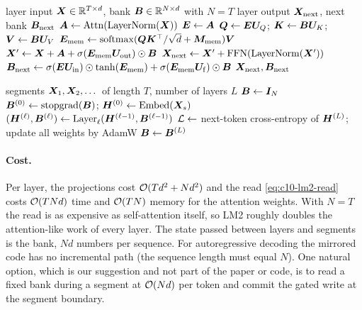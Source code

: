 \begin{algorithm}[t]
\caption{One LM2 decoder layer (parallel form, per-token gates)}\label{alg:c10-lm2-layer}
\begin{algorithmic}[1]
\Require layer input $\bm{X} \in \mathbb{R}^{T\times d}$, bank $\bm{B} \in \mathbb{R}^{N\times d}$ with $N = T$
\Ensure layer output $\bm{X}_{\mathrm{next}}$, next bank $\bm{B}_{\mathrm{next}}$
\State $\bm{A} \gets \mathrm{Attn}(\operatorname{LayerNorm}(\bm{X}))$ 
\State $\bm{E} \gets \bm{A}$ 
\State $\bm{Q} \gets \bm{E}\bm{U}_Q$;\; $\bm{K} \gets \bm{B}\bm{U}_K$;\; $\bm{V} \gets \bm{B}\bm{U}_V$
\State $\bm{E}_{\mathrm{mem}} \gets \operatorname{softmax}(\bm{Q}\bm{K}^{\top}/\sqrt{d} + \bm{M}_{\mathrm{mem}})\bm{V}$
\State $\bm{X}' \gets \bm{X} + \bm{A} + \sigma(\bm{E}_{\mathrm{mem}}\bm{U}_{\mathrm{out}}) \odot \bm{B}$
\State $\bm{X}_{\mathrm{next}} \gets \bm{X}' + \mathrm{FFN}(\operatorname{LayerNorm}(\bm{X}'))$
\State $\bm{B}_{\mathrm{next}} \gets \sigma(\bm{E}\bm{U}_{\mathrm{in}}) \odot \tanh(\bm{E}_{\mathrm{mem}})
       + \sigma(\bm{E}_{\mathrm{mem}}\bm{U}_{\mathrm{f}}) \odot \bm{B}$
\State \Return $\bm{X}_{\mathrm{next}}, \bm{B}_{\mathrm{next}}$
\end{algorithmic}
\end{algorithm}

\begin{algorithm}[t]
\caption{LM2 training on a stream of segments (as organized in the official code)}\label{alg:c10-lm2-train}
\begin{algorithmic}[1]
\Require segments $\bm{X}_1, \bm{X}_2, \dots$ of length $T$, number of layers $L$
\State $\bm{B} \gets \bm{I}_N$ 
  \State $\bm{B}^{(0)} \gets \mathrm{stopgrad}(\bm{B})$;\; $\bm{H}^{(0)} \gets \mathrm{Embed}(\bm{X}_s)$
    \State $(\bm{H}^{(\ell)}, \bm{B}^{(\ell)}) \gets \mathrm{Layer}_\ell(\bm{H}^{(\ell-1)}, \bm{B}^{(\ell-1)})$
  \EndFor
  \State $\mathcal{L} \gets$ next-token cross-entropy of $\bm{H}^{(L)}$;\; update all weights by AdamW
  \State $\bm{B} \gets \bm{B}^{(L)}$ 
\EndFor
\end{algorithmic}
\end{algorithm}

\paragraph{Cost.} Per layer, the projections cost $\mathcal{O}(T d^2 + N d^2)$ and the read
\eqref{eq:c10-lm2-read} costs $\mathcal{O}(T N d)$ time and $\mathcal{O}(T N)$ memory for the attention weights.
With $N = T$ the read is as expensive as self-attention itself, so LM2 roughly doubles the
attention-like work of every layer. The state passed between layers and segments is the bank,
$N d$ numbers per sequence. For autoregressive decoding the mirrored code has no incremental path
(the sequence length must equal $N$). One natural option, which is our suggestion and not part of
the paper or code, is to read a fixed bank during a segment at $\mathcal{O}(N d)$ per token and commit the
gated write at the segment boundary.

